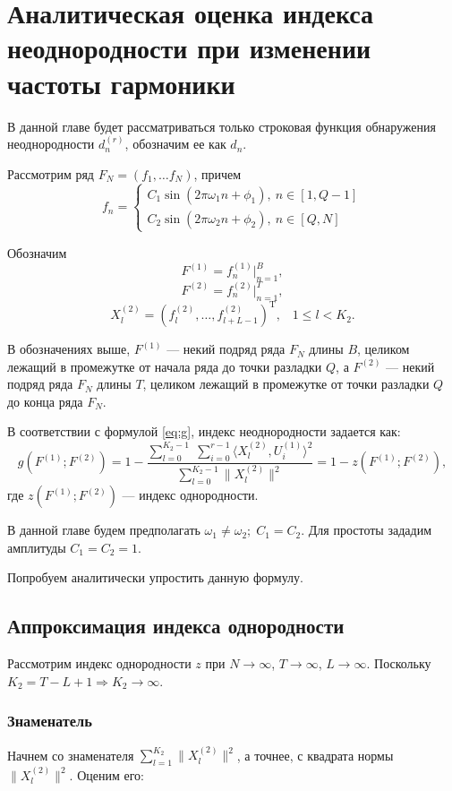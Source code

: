 \documentclass[specialist, substylefile = spbu.rtx,
			   subf, href, 12pt]{disser}
\begin{document}
\newpage
\chapter{Аналитическая оценка индекса неоднородности при изменении частоты гармоники} \label{sec:ch_4}
В данной главе будет рассматриваться только строковая функция обнаружения неоднородности $ d_n^{(r)} $, обозначим ее как $ d_n $.

Рассмотрим ряд $ F_N = (f_1, \dots f_{N}) $, причем  
\begin{equation*} 
	f_n = 
	\begin{cases} 
		C_1\sin(2\pi\omega_1 n + \phi_1),\ n \in [1, Q-1] \\ 
		C_2\sin(2\pi\omega_2 n + \phi_2),\ n \in [Q, N] 
	\end{cases} 
\end{equation*} 

Обозначим 
$$ F^{(1)} = f_n^{(1)}|_{n=1}^{B}, $$
$$ F^{(2)} = f_n^{(2)}|_{n=1}^{T}, $$
$$X_l^{(2)} = (f_{l}^{(2)}, \dotsc, f_{l+L-1}^{(2)})^\mathrm{T}, \;\;\; 1 \leq l < K_2.$$

В обозначениях выше, $ F^{(1)} $ --- некий подряд ряда $ F_N $ длины $ B $, целиком лежащий в промежутке от начала ряда до точки разладки $ Q $, а  $ F^{(2)} $ --- некий подряд ряда $ F_N $ длины $ T $, целиком лежащий в промежутке от точки разладки $ Q $ до конца ряда $ F_N $. 


В соответствии с формулой \eqref{eq:g}, индекс неоднородности задается как:
$$ g(F^{(1)}; F^{(2)}) = 1 - \frac{\sum\limits_{l=0}^{K_2-1}\;\sum\limits_{i=0}^{r-1}\langle X_l^{(2)}, U_i^{(1)}\rangle^2}{\sum\limits_{l=0}^{K_2-1}\|X_l^{(2)}\|^2} = 1 - z(F^{(1)}; F^{(2)}),  $$
где $ z(F^{(1)}; F^{(2)}) $ --- индекс однородности.

В данной главе будем предполагать $ \omega_1 \neq \omega_2;\; C_1 = C_2 $. Для простоты зададим амплитуды $ C_1 = C_2 = 1 $.

Попробуем аналитически упростить данную формулу.

\section{Аппроксимация индекса однородности}
Рассмотрим индекс однородности $ z $ при $ N \rightarrow \infty $, $ T \rightarrow \infty $, $ L \rightarrow \infty $. Поскольку $ K_2 = T - L + 1 \Rightarrow K_2 \rightarrow \infty $.


\subsection{Знаменатель}\label{sec:denominator}
Начнем со знаменателя $\sum\limits_{l=1}^{K_2}\|X_l^{(2)}\|^2$, а точнее, с квадрата нормы $\|X_l^{(2)}\|^2$. Оценим его:
\end{document}
